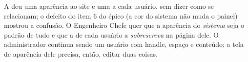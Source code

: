 {A  deu uma aparência ao site e uma a cada usuário, sem dizer como se relacionam; o defeito do item 6 do épico (a cor do sistema não muda o painel) mostrou a confusão. O Engenheiro Chefe quer que a aparência do \emph{sistema} seja o padrão de tudo e que a de cada usuário a \emph{sobrescreva} na página dele. O administrador continua sendo um usuário com handle, espaço e conteúdo; a tela de aparência dele precisa, então, editar duas coisas.}
